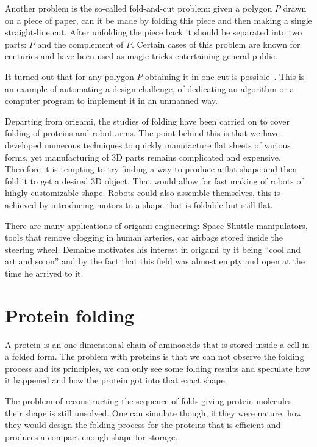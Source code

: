 \documentclass[a4paper,12pt]{article}
\begin{document}
Another problem is the so-called fold-and-cut problem: given a polygon \(P\) drawn on a piece of paper, can it be made by folding this piece and then making a single straight-line cut. After unfolding the piece back it should be separated into two parts: \(P\) and the complement of \(P\). Certain cases of this problem are known for centuries and have been used as magic tricks entertaining general public.

It turned out that for any polygon \(P\) obtaining it in one cut is possible~\cite{stcut}. This is an example of automating a design challenge, of dedicating an algorithm or a computer program to implement it in an unmanned way.

Departing from origami, the studies of folding have been carried on to cover folding of proteins and robot arms. The point behind this is that we have developed numerous techniques to quickly manufacture flat sheets of various forms, yet manufacturing of 3D parts remains complicated and expensive. Therefore it is tempting to try finding a way to produce a flat shape and then fold it to get a desired 3D object. That would allow for fast making of robots of hihgly customizable shape. Robots could also assemble themselves, this is achieved by introducing motors to a shape that is foldable but still flat.

There are many applications of origami engineering: Space Shuttle manipulators, tools that remove clogging in human arteries, car airbags stored inside the steering wheel. Demaine motivates his interest in origami by it being “cool and art and so on” and by the fact that this field was almost empty and open at the time he arrived to it.

\section{Protein folding}

A protein is an one-dimensional chain of aminoacids that is stored inside a cell in a folded form. The problem with proteins is that we can not observe the folding process and its principles, we can only see some folding results and speculate how it happened and how the protein got into that exact shape.

The problem of reconstructing the sequence of folds giving protein molecules their shape is still unsolved. One can simulate though, if they were nature, how they would design the folding process for the proteins that is efficient and produces a compact enough shape for storage.
\end{document}

